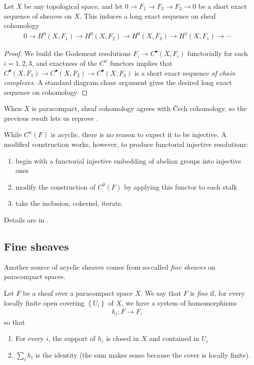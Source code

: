 \documentclass[11pt]{amsart}
\begin{document}
\begin{proposition}\label{prop:LES-sheaf-cohomology-any-space} Let $X$ be any topological space, and let $0 \to F_1 \to F_2 \to F_3 \to 0$ be a short exact sequence of sheaves on $X$. This induces a long exact sequence on sheaf cohomology
\begin{align*}
    0 \to H^0(X,F_1) \to H^0(X,F_2) \to H^0(X,F_3) \to H^1(X,F_1) \to \cdots
\end{align*}
\end{proposition}
\begin{proof} We build the Godement resolutions $F_i \to C^\bullet(X,F_i)$ functorially for each $i=1,2,3$, and exactness of the $C^n$ functors implies that $C^\bullet(X,F_1) \to C^\bullet(X,F_2) \to C^\bullet(X,F_3)$ is a short exact sequence \emph{of chain complexes}. A standard diagram chase argument gives the desired long exact sequence on cohomology.
\end{proof}

When $X$ is paracompact, sheaf cohomology agrees with \v{C}ech cohomology, so the previous result lets us reprove .

\begin{remark} While $C^n(F)$ is acyclic, there is no reason to expect it to be injective. A modified construction works, however, to produce functorial injective resolutions:
\begin{enumerate}
    \item begin with a functorial injective embedding of abelian groups into injective ones
    \item modify the construction of $C^0(F)$ by applying this functor to each stalk
    \item take the inclusion, cokernel, iterate.
\end{enumerate}
Details are in \cite[01DG]{Stacks}.
\end{remark}


\subsection{Fine sheaves}

Another source of acyclic sheaves comes from so-called \emph{fine sheaves} on paracompact spaces.

\begin{definition}\label{def:fine-sheaf} 
Let $F$ be a sheaf over a paracompact space $X$. We say that $F$ is \emph{fine} if, for every locally finite open covering $\left\{ U_i \right\}$ of $X$, we have a system of homomorphisms
\begin{align*}
    h_i \colon F \to F,
\end{align*}
so that
\begin{enumerate}
    \item For every $i$, the support of $h_i$ is closed in $X$ and contained in $U_i$
    \item $\sum_i h_i$ is the identity (the sum makes sense because the cover is locally finite).
\end{enumerate}
\end{definition}
\end{document}

